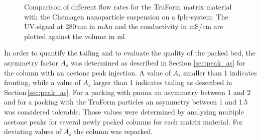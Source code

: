 \begin{figure}[H]
\centering

\caption[Comparison of different flow rates for the TruForm matrix material]{Comparison of different flow rates for the TruForm matrix material with the Chemagen nanoparticle suspension on a \gls{fplc}-system: The UV-signal at 280\,nm in mAu and the conductivity in mS/cm are plotted against the volume in ml   
\label{fig:flowrate_prax}
}
\end{figure}

In order to quantify the tailing and to evaluate the quality of the packed bed, the asymmetry factor $A_{s}$ was determined as described in Section \ref{sec:peak_as} for the column with an acetone peak injection. A value of $A_{s}$ smaller than 1 indicates fronting, while a value of $A_{s}$ larger than 1 indicates tailing as described in Section\,\ref{sec:peak_as}. For a packing with \gls{pmma} an asymmetry between 1 and 2 and for a packing with the TruForm particles an asymmetry between 1 and 1.5 was considered tolerable. Those values were determined by analyzing multiple acetone peaks for several newly packed columns for each matrix material. For deviating values of $A_{s}$ the column was repacked. 

